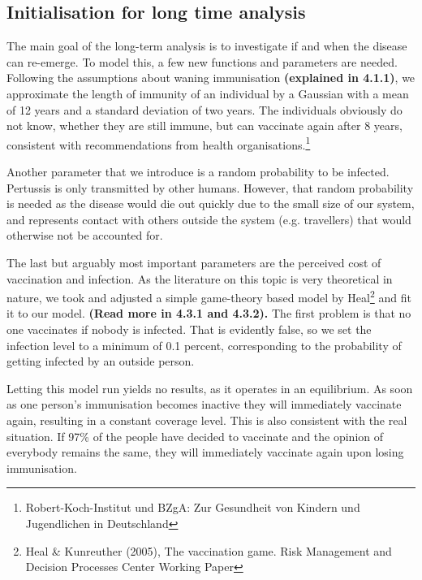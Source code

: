 \documentclass[11pt]{article}
\begin{document}
\subsection{Initialisation for long time analysis}
The main goal of the long-term analysis is to investigate if and when the disease can re-emerge. To model this, a few new functions and parameters are needed. Following the assumptions about waning immunisation \textbf{(explained in 4.1.1)}, we approximate the length of immunity of an individual by a Gaussian with a mean of 12 years and a standard deviation of two years. The individuals obviously do not know, whether they are still immune, but can vaccinate again after 8 years, consistent with recommendations from health organisations.\footnote{Robert-Koch-Institut und BZgA: Zur Gesundheit von Kindern und Jugendlichen in Deutschland} 

Another parameter that we introduce is a random probability to be infected. Pertussis is only transmitted by other humans. However, that random probability is needed as the disease would die out quickly due to the small size of our system, and represents contact with others outside the system (e.g. travellers) that would otherwise not be accounted for. 

The last but arguably most important parameters are the perceived cost of vaccination and infection. As the literature on this topic is very theoretical in nature, we took and adjusted a simple game-theory based model by Heal\footnote{Heal \& Kunreuther (2005), The vaccination game. Risk Management and Decision Processes Center Working Paper} and fit it to our model. \textbf{(Read more in 4.3.1 and 4.3.2).} The first problem is that no one vaccinates if nobody is infected. That is evidently false, so we set the infection level to a minimum of 0.1 percent, corresponding to the probability of getting infected by an outside person.
\vspace{14px}


Letting this model run yields no results, as it operates in an equilibrium. As soon as one person’s immunisation becomes inactive they will immediately vaccinate again, resulting in a constant coverage level. This is also consistent with the real situation. If 97\% of the people have decided to vaccinate and the opinion of everybody remains the same, they will immediately vaccinate again upon losing immunisation.
\vspace{14px}
\end{document}
